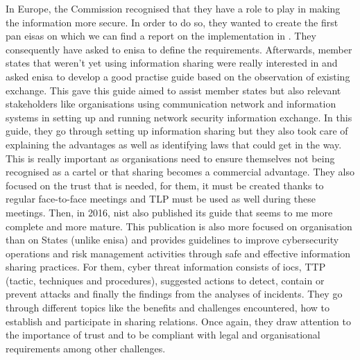 \documentclass{eplmastersthesis}
\begin{document}
In Europe, the Commission recognised that they have a role to play in making the information more secure. In order to do so, they wanted to create the first pan \gls{eisas} on which we can find a report on the implementation in \cite{eisasRapport}.  They consequently have asked to \gls{enisa} to define the requirements. Afterwards, member states that weren't yet using information sharing were really interested in and asked \gls{enisa} to develop a good practise guide based on the observation of existing exchange. This gave this guide \cite{enisaguide2009} aimed to assist member states but also relevant stakeholders like organisations using communication network and information systems in setting up and running network security information exchange.
In this guide, they go through setting up information sharing but they also took care of explaining the advantages as well as identifying laws that could get in the way. This is really important as organisations need to ensure themselves not being recognised as a cartel or that sharing becomes a commercial advantage. They also focused on the trust that is needed, for them, it must be created thanks to regular face-to-face meetings and TLP must be used as well during these meetings.
Then, in 2016, \gls{nist} also published its guide \cite{johnson2014guide} that seems to me more complete and more mature. This publication is also more focused on organisation than on States (unlike \gls{enisa}) and provides guidelines to improve cybersecurity operations and risk management activities through safe and effective information sharing practices.
For them, cyber threat information consists of \glspl{ioc}, TTP (tactic, techniques and procedures), suggested actions to detect, contain or prevent attacks and finally the findings from the analyses of incidents. 
They go through different topics like the benefits and challenges encountered, how to establish and participate in sharing relations. Once again, they draw attention to the importance of trust and to be compliant with legal and organisational requirements among other challenges.\\
\end{document}
